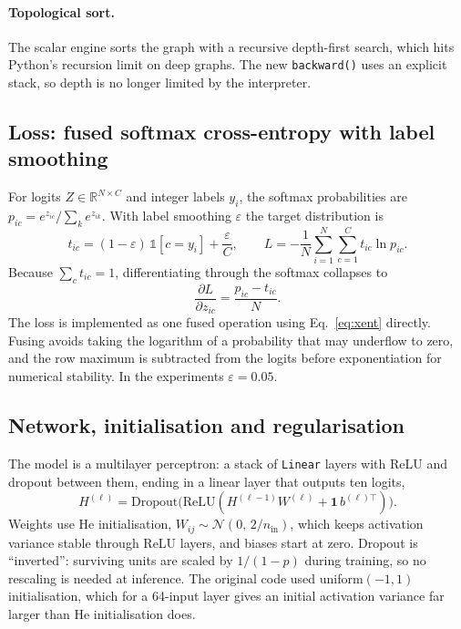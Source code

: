 \documentclass[11pt,a4paper]{article}
\newcommand{\code}[1]{\texttt{#1}}
\begin{document}
\paragraph{Topological sort.} The scalar engine sorts the graph with a recursive depth-first search, which hits Python's recursion limit on deep graphs. The new \code{backward()} uses an explicit stack, so depth is no longer limited by the interpreter.

\subsection{Loss: fused softmax cross-entropy with label smoothing}
For logits $Z\in\mathbb{R}^{N\times C}$ and integer labels $y_i$, the softmax probabilities are $p_{ic}=e^{z_{ic}}/\sum_k e^{z_{ik}}$. With label smoothing $\varepsilon$ the target distribution is
\begin{equation}
  t_{ic}=(1-\varepsilon)\,\mathbb{1}[c=y_i]+\frac{\varepsilon}{C},
  \qquad
  L=-\frac{1}{N}\sum_{i=1}^{N}\sum_{c=1}^{C} t_{ic}\ln p_{ic}.
\end{equation}
Because $\sum_c t_{ic}=1$, differentiating through the softmax collapses to
\begin{equation}
  \frac{\partial L}{\partial z_{ic}}=\frac{p_{ic}-t_{ic}}{N}.
  \label{eq:xent}
\end{equation}
The loss is implemented as one fused operation using Eq.~\eqref{eq:xent} directly. Fusing avoids taking the logarithm of a probability that may underflow to zero, and the row maximum is subtracted from the logits before exponentiation for numerical stability. In the experiments $\varepsilon=0.05$.

\subsection{Network, initialisation and regularisation}
The model is a multilayer perceptron: a stack of \code{Linear} layers with ReLU and dropout between them, ending in a linear layer that outputs ten logits,
\begin{equation}
  H^{(\ell)}=\mathrm{Dropout}\!\big(\mathrm{ReLU}(H^{(\ell-1)}W^{(\ell)}+\mathbf{1}\,b^{(\ell)\top})\big).
\end{equation}
Weights use He initialisation, $W_{ij}\sim\mathcal{N}(0,\,2/n_{\mathrm{in}})$, which keeps activation variance stable through ReLU layers, and biases start at zero. Dropout is ``inverted'': surviving units are scaled by $1/(1-p)$ during training, so no rescaling is needed at inference. The original code used uniform$(-1,1)$ initialisation, which for a 64-input layer gives an initial activation variance far larger than He initialisation does.
\end{document}
